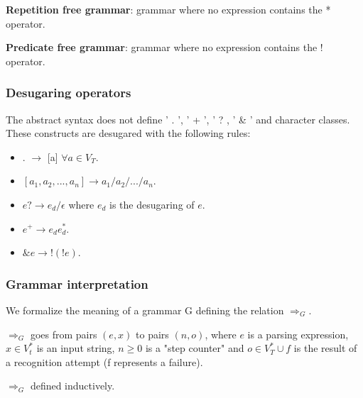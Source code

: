 \begin{frame}
	\begin{block}{}
		\textbf{Repetition free grammar}: grammar where no expression contains the * operator.
		
	\end{block}

	\begin{block}{}
		\textbf{Predicate free grammar}: grammar where no expression contains the ! operator.
		
	\end{block}
\end{frame}

\begin{frame}
	\frametitle{Desugaring operators}
	The abstract syntax does not define  ' . ', ' + ', ' ? , ' \& ' and character classes.
	These constructs are desugared with the following rules:\begin{itemize}
		\item . $\rightarrow$ [a] $\forall a \in V_T$.
		\item $[a_1,a_2, ... , a_n] \rightarrow a_1 / a_2 / ... / a_n$.
		\item  	$e? \rightarrow e_d / \epsilon$  where $e_d$ is the desugaring of $e$.
		\item $ e^+ \rightarrow e_de_d^*$.
		\item $\&e \rightarrow !(!e)$.
\end{itemize} 
\end{frame}
\begin{frame}
	
	\frametitle{Grammar interpretation}
	We formalize the meaning of a grammar G defining the relation $\Rightarrow_G$.
	
	$\Rightarrow_G$ goes from pairs $(e,x)$ to pairs $(n,o)$, where $e$ is a parsing expression, $x \in V_t^*$ is an input string, $n \geq 0$ is a "step counter"  and $ o \in V_T^* \cup {f}$ is the result of a recognition  attempt (f represents a failure). 
	
	$\Rightarrow_G$ defined inductively.
\end{frame}
